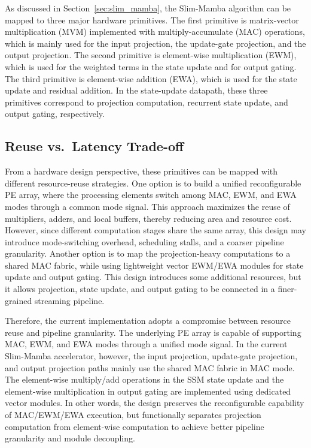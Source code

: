 \documentclass[11pt,twoside]{eitExjobb}
\begin{document}
As discussed in Section~\ref{sec:slim_mamba}, the Slim-Mamba algorithm can be mapped to
three major hardware primitives. The first primitive is matrix-vector multiplication
(MVM) implemented with multiply-accumulate (MAC) operations, which is mainly used for
the input projection, the update-gate projection, and the output
projection. The second primitive is element-wise multiplication (EWM), which is used
for the weighted terms in the state update and for output gating. The third primitive is
element-wise addition (EWA), which is used for the state update and residual addition.
In the state-update datapath, these three primitives correspond to projection
computation, recurrent state update, and output gating, respectively.

\subsection{Reuse vs.\ Latency Trade-off}
From a hardware design perspective, these primitives can be mapped with different
resource-reuse strategies. One option is to build a unified reconfigurable PE array,
where the processing elements switch among MAC, EWM, and EWA modes through a common
mode signal. This approach maximizes the reuse of multipliers, adders, and local
buffers, thereby reducing area and resource cost. However, since different computation
stages share the same array, this design may introduce mode-switching overhead,
scheduling stalls, and a coarser pipeline granularity. Another option is to map the
projection-heavy computations to a shared MAC fabric, while using lightweight vector
EWM/EWA modules for state update and output gating. This design introduces some
additional resources, but it allows projection, state update, and output gating to be
connected in a finer-grained streaming pipeline.


Therefore, the current implementation adopts a compromise between resource reuse and
pipeline granularity. The underlying PE array is capable of supporting MAC, EWM, and
EWA modes through a unified mode signal. In the current Slim-Mamba accelerator,
however, the input projection, update-gate projection, and output projection paths mainly use
the shared MAC fabric in MAC mode. The element-wise multiply/add operations in the SSM
state update and the element-wise multiplication in output gating are implemented using
dedicated vector modules. In other words, the design preserves the reconfigurable
capability of MAC/EWM/EWA execution, but functionally separates projection computation
from element-wise computation to achieve better pipeline granularity and module
decoupling.
\end{document}
